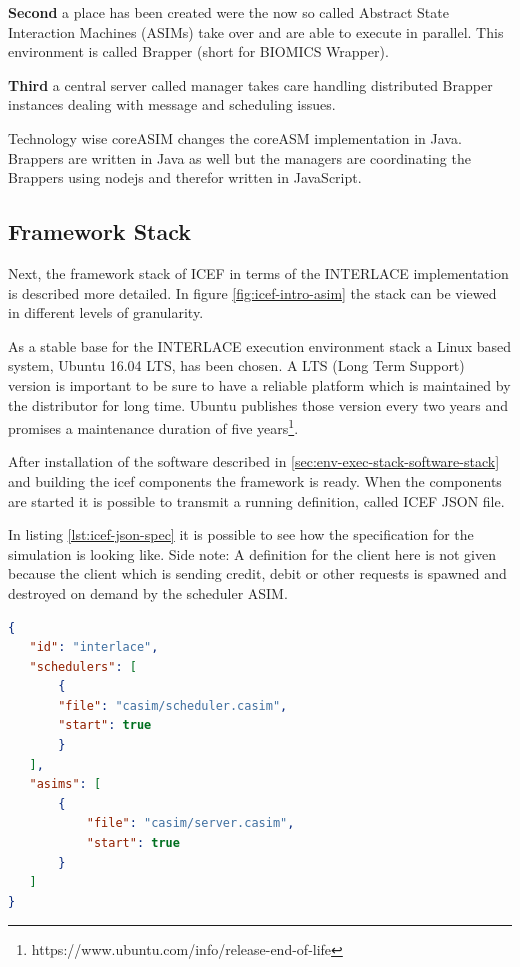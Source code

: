 \textbf{Second} a place has been created were the now so called Abstract State Interaction Machines (ASIMs) take over and are able to execute in parallel. This environment is called Brapper (short for BIOMICS Wrapper).

\textbf{Third} a central server called manager takes care handling distributed Brapper instances dealing with message and scheduling issues.

Technology wise coreASIM changes the coreASM implementation in Java. Brappers are written in Java as well but the managers are coordinating the Brappers using nodejs and therefor written in JavaScript.

\subsection{Framework Stack}

Next, the framework stack of ICEF in terms of the INTERLACE implementation is described more detailed. In figure \ref{fig:icef-intro-asim} the stack can be viewed in different levels of granularity.

As a stable base for the INTERLACE execution environment stack a Linux based system, Ubuntu 16.04 LTS, has been chosen. A LTS (Long Term Support) version is important to be sure to have a reliable platform which is maintained by the distributor for long time. Ubuntu publishes those version every two years and promises a maintenance duration of five years\footnote{https://www.ubuntu.com/info/release-end-of-life}.

After installation of the software described in \ref{sec:env-exec-stack-software-stack} and building the icef components the framework is ready. When the components are started it is possible to transmit a running definition, called ICEF JSON file.

In listing \ref{lst:icef-json-spec} it is possible to see how the specification for the simulation is looking like. Side note: A definition for the client here is not given because the client which is sending credit, debit or other requests is spawned and destroyed on demand by the scheduler ASIM.

\begin{lstlisting}[language=json,firstnumber=1,caption={ICEF Json Specification for Interlace},captionpos=b,label=lst:icef-json-spec]
{
   "id": "interlace", 
   "schedulers": [
       {
	   "file": "casim/scheduler.casim",
	   "start": true
       }
   ], 
   "asims": [       
       {
           "file": "casim/server.casim",
           "start": true
       }
   ]
}
\end{lstlisting}

